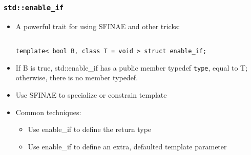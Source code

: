 \begin{frame}[fragile,t]
\frametitle{\texttt{std::enable\_if}}
\begin{itemize}[<+->]
\item A powerful trait for using SFINAE and other tricks:
\vskip 6pt
{\begin{verbatim}

template< bool B, class T = void > struct enable_if;
\end{verbatim}
}
\vskip 6pt
\item If B is true, std::enable\_if has a public member typedef \texttt{type}, equal to T; otherwise, there is no member typedef. 
\item Use SFINAE to specialize or constrain template
\item Common techniques:
  \begin{itemize}
    \item Use enable\_if to define the return type
    \item Use enable\_if to define an extra, defaulted template parameter
  \end{itemize}
\end{itemize}
\pause
\end{frame}


